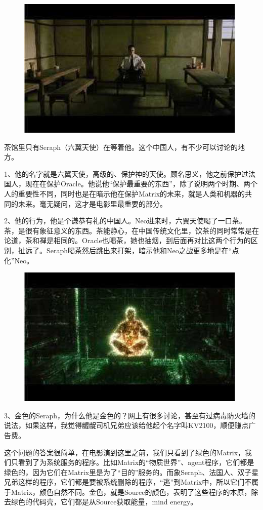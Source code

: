 \documentclass{ctexart}
\begin{document}
\begin{figure}[htb]
\centering
\includegraphics[width=0.5\linewidth]{fig/read_reloaded-58}
\end{figure}

茶馆里只有Seraph（六翼天使）在等着他。这个中国人，有不少可以讨论的地方。

1、他的名字就是六翼天使，高级的、保护神的天使。顾名思义，他之前保护过法国人，现在在保护Oracle。他说他“保护最重要的东西”，除了说明两个时期、两个人的重要性不同，同时也是在暗示他在保护Matrix的未来，就是人类和机器的共同的未来。毫无疑问，这才是电影里最重要的部分。

2、他的行为，他是个谦恭有礼的中国人。Neo进来时，六翼天使喝了一口茶。茶，是很有象征意义的东西。茶能静心，在中国传统文化里，饮茶的同时常常是在论道，茶和禅是相同的。Oracle也喝茶，她也抽烟，到后面再对比这两个行为的区别，扯远了。Seraph喝茶然后跳出来打架，暗示他和Neo之战更多地是在“点化”Neo。

\begin{figure}[htb]
\centering
\includegraphics[width=0.5\linewidth]{fig/read_reloaded-59}
\end{figure}

3、金色的Seraph，为什么他是金色的？网上有很多讨论，甚至有过病毒防火墙的说法，如果这样，我觉得龌龊司机兄弟应该给他起个名字叫KV2100，顺便赚点广告费。

这个问题的答案很简单，在电影演到这里之前，我们只看到了绿色的Matrix，我们只看到了为系统服务的程序。比如Matrix的“物质世界”、agent程序，它们都是绿色的，因为它们在Matrix里是为了“目的”服务的。而象Seraph、法国人、双子星兄弟这样的程序，它们都是要被系统删除的程序，“逃”到Matrix中，所以它们不属于Matrix，颜色自然不同。金色，就是Source的颜色，表明了这些程序的本原，除去绿色的代码壳，它们都是从Source获取能量，mind energy。
\end{document}
